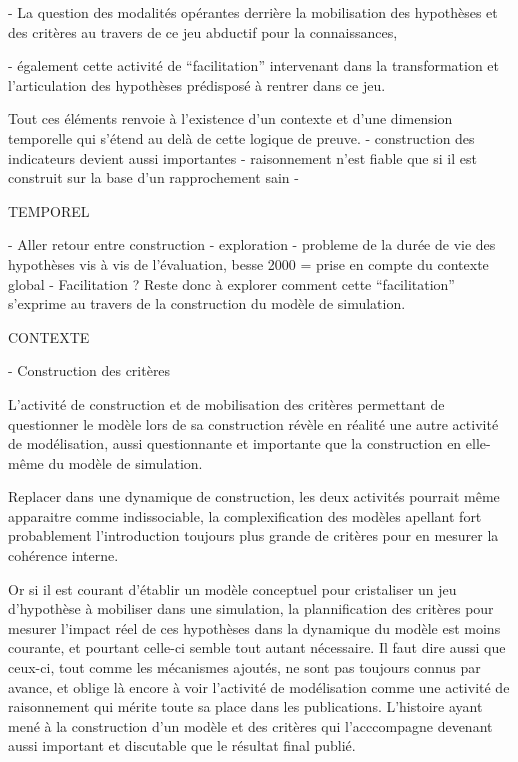 

- La question des modalités opérantes derrière la mobilisation des hypothèses et des critères au travers de ce jeu abductif pour la connaissances, 

- également cette activité de \enquote{facilitation} intervenant dans la transformation et l'articulation des hypothèses prédisposé à rentrer dans ce jeu. 

Tout ces éléments renvoie à l'existence d'un contexte et d'une dimension temporelle qui s'étend au delà de cette logique de preuve.
 - construction des indicateurs devient aussi importantes
 - raisonnement n'est fiable que si il est construit sur la base d'un rapprochement sain
 -



TEMPOREL 

- Aller retour entre construction - exploration 
- probleme de la durée de vie des hypothèses vis à vis de l'évaluation, besse 2000 = prise en compte du contexte global
- Facilitation ? Reste donc à explorer comment cette \enquote{facilitation} s'exprime au travers de la construction du modèle de simulation. 

CONTEXTE


- Construction des critères

L'activité de construction et de mobilisation des critères permettant de questionner le modèle lors de sa construction révèle en réalité une autre activité de modélisation, aussi questionnante et importante que la construction en elle-même du modèle de simulation. 

Replacer dans une dynamique de construction, les deux activités pourrait même apparaitre comme indissociable, la complexification des modèles apellant fort probablement l'introduction toujours plus grande de critères pour en mesurer la cohérence interne.

Or si il est courant d'établir un modèle conceptuel pour cristaliser un jeu d'hypothèse à mobiliser dans une simulation, la plannification des critères pour mesurer l'impact réel de ces hypothèses dans la dynamique du modèle est moins courante, et pourtant celle-ci semble tout autant nécessaire. Il faut dire aussi que ceux-ci, tout comme les mécanismes ajoutés, ne sont pas toujours connus par avance, et oblige là encore à voir l'activité de modélisation comme une activité de raisonnement qui mérite toute sa place dans les publications. L'histoire ayant mené à la construction d'un modèle et des critères qui l'acccompagne devenant aussi important et discutable que le résultat final publié.












